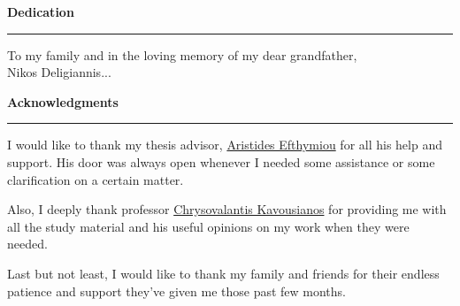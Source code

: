 
%

\label{Dedication}
\begin{flushleft}
\huge
\textbf{Dedication}\\
\noindent\rule{10cm}{0.4pt}
\end{flushleft}
To my family and in the loving memory of my dear grandfather, \\
Nikos Deligiannis...
\label{Acknowledgements}
\newpage
\begin{flushleft}
	\huge
	\textbf{Acknowledgments}\\
	\noindent\rule{10cm}{0.4pt}
\end{flushleft}
I would like to thank my thesis advisor, \underline{Aristides Efthymiou} for all his help and support. His door was always open whenever I needed some assistance or some clarification on a certain matter.\par
Also, I deeply thank professor \underline{Chrysovalantis Kavousianos} for providing me with all the study material and his useful opinions on my work when they were needed. \par
Last but not least, I would like to thank my family and friends for their endless patience and support they've given me those past few months.

%
